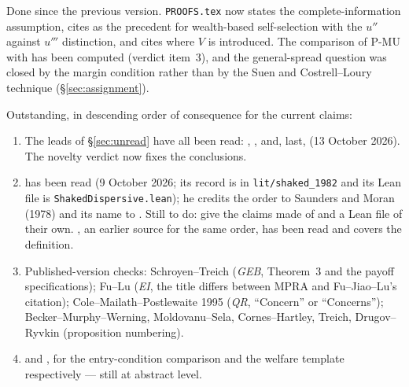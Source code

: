 \documentclass[11pt,a4paper]{article}
\begin{document}
Done since the previous version. \texttt{PROOFS.tex} now states the
complete-information assumption, cites \citet{LazearRosen1981} as the
precedent for wealth-based self-selection with the $u''$ against $u'''$
distinction, and cites
\citet{ColeMailathPostlewaite1992,ColeMailathPostlewaite1995} where $V$ is
introduced. The comparison of P-MU with \citet{RyvkinDrugov2020} has been
computed (verdict item~3), and the general-spread question was closed by the
margin condition rather than by the Suen and Costrell--Loury technique
(\S\ref{sec:assignment}).

Outstanding, in descending order of consequence for the current claims:

\begin{enumerate}
\item The leads of \S\ref{sec:unread} have all been read:
  \citet{FullertonMcAfee1999}, \citet{MathewsNamoro2008}, \citet{Corcoran1984}
  and, last, \citet{CorcoranKarels1985} (13 October 2026). The novelty verdict
  now fixes the conclusions.
\item \citet{Shaked1982} has been read (9 October 2026; its record is in
  \texttt{lit/shaked\_1982} and its Lean file is
  \texttt{ShakedDispersive.lean}); he credits the order to Saunders
  and Moran (1978) and its name to \citet{LewisThompson1981}. Still to do: give
  the claims made of \citet{HopkinsKornienko2004} and
  \citet{HopkinsKornienko2009} a Lean file of their own.
  \citet{LewisThompson1981}, an earlier source for the same order, has been
  read and covers the definition.
\item Published-version checks: Schroyen--Treich (\emph{GEB}, Theorem~3 and
  the payoff specifications); Fu--Lu (\emph{EI}, the title differs between
  MPRA and Fu--Jiao--Lu's citation); Cole--Mailath--Postlewaite 1995
  (\emph{QR}, ``Concern'' or ``Concerns''); Becker--Murphy--Werning, Moldovanu--Sela, Cornes--Hartley, Treich,
  Drugov--Ryvkin (proposition numbering).
\item \citet{GrossmannDietl2015} and \citet{ChungLee2017}, for the
  entry-condition comparison and the welfare template respectively --- still
  at abstract level.
\end{enumerate}



\end{document}
